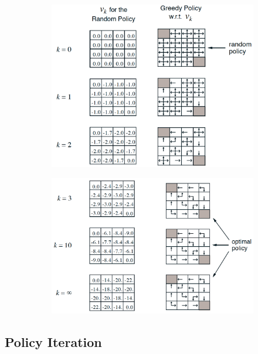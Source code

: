 \documentclass[a4paper]{article}
\begin{document}
		\begin{figure}[htb!]
			\centering
			\begin{subfigure}[b]{0.475\textwidth}
				\centering
				\includegraphics[width=\textwidth]{img/08_reinforcement_learning/policy_eval_01.png}
			\end{subfigure}
			\hfill
			\begin{subfigure}[b]{0.475\textwidth}
				\centering
				\includegraphics[width=\textwidth]{img/08_reinforcement_learning/policy_eval_02.png}
			\end{subfigure}
		\end{figure}
		
		\subsection{Policy Iteration}
		
\end{document}
